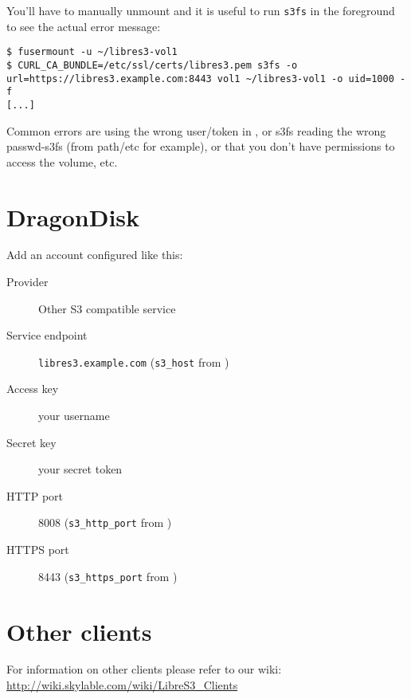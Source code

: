 You'll have to manually unmount and it is useful to run \verb|s3fs| in the
foreground to see the actual error message:
\begin{lstlisting}
$ fusermount -u ~/libres3-vol1
$ CURL_CA_BUNDLE=/etc/ssl/certs/libres3.pem s3fs -o url=https://libres3.example.com:8443 vol1 ~/libres3-vol1 -o uid=1000 -f
[...]
\end{lstlisting}

Common errors are using the wrong user/token in , or
s3fs reading the wrong passwd-s3fs (from path{/etc} for example), or that you don't have permissions to access the volume, etc.

\section{DragonDisk}
\label{sec:dragondisk}

Add an account configured like this:
\begin{description}
\item [Provider] Other S3 compatible service
\item [Service endpoint] \verb|libres3.example.com| (\verb|s3_host| from )
\item [Access key] your \SX username
\item [Secret key] your \SX secret token
\item [HTTP port] 8008 (\verb|s3_http_port| from )
\item [HTTPS port] 8443 (\verb|s3_https_port| from )
\end{description}

\section{Other clients}
For information on other clients please refer to our wiki:
\url{http://wiki.skylable.com/wiki/LibreS3_Clients}
